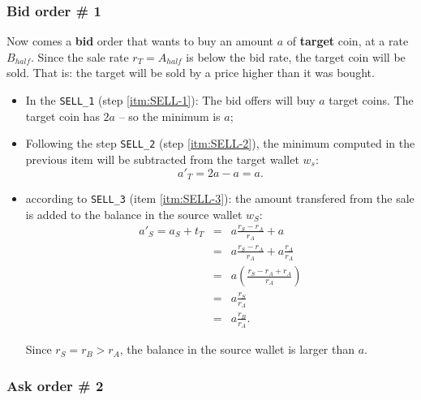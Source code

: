\documentclass[a4paper,11pt]{article}
\newcommand\ddfrac[2]{\frac{\displaystyle #1}{\displaystyle #2}}
\begin{document}
        
\subsubsection{Bid order \# 1} 
    
Now comes a {\bf bid} order that wants to buy an amount $a$ of {\bf target} coin, at a rate 
$B_{half}$.  Since the sale rate $r_T = A_{half}$ is below the bid rate, the target coin will be 
sold. That is: the target will be sold by a price higher than it was bought.
	
\begin{itemize}
    \item  In the {\tt SELL\_1} (step \ref{itm:SELL-1}): The bid offers will buy $a$ target coins.
	The target coin has $2a$ -- so the minimum is $a$;
	
    \item Following the step {\tt SELL\_2} (step \ref{itm:SELL-2}), the minimum computed in the 
	previous item will be subtracted from the target wallet $w_s$: 
	\begin{equation*}
	    a'_T = 2a - a = a.
	\end{equation*}
	
    \item according to {\tt SELL\_3} (item \ref{itm:SELL-3}):
	the amount transfered from the sale is added to the balance in the source wallet $w_S$:
	\doublespacing
	\begin{equation*}
	\begin{array}{lcl}
 	    a'_S = a_S + t_T & = & a \ddfrac{r_S - r_A}{r_A} + a \\
 	                     & = & a \ddfrac{r_S - r_A}{r_A} + a \ddfrac{r_A}{r_A} \\
 	                     & = & a \left( \ddfrac{r_S - r_A + r_A}{r_A} \right) \\
 	                     & = & a \ddfrac{r_S}{r_A} \\
 	                     & = & a \ddfrac{r_B}{r_A}.
	\end{array}
	\end{equation*}
	\singlespacing
	
	Since $r_S = r_B > r_A$, the balance in the source wallet is larger than $a$.

\end{itemize}

	
\subsubsection{Ask order \# 2}
    
\end{document}
